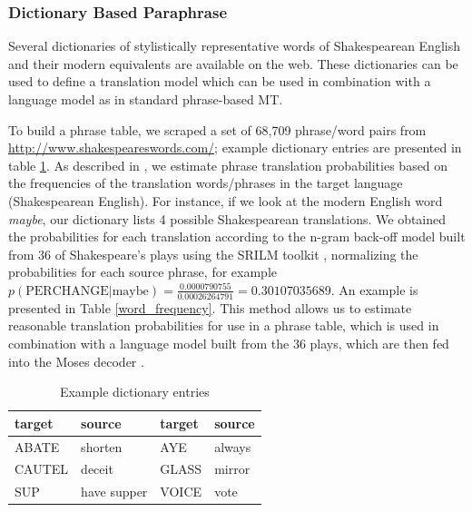 \documentclass[10pt,a5paper,twoside]{article}
\begin{document}
\subsubsection{Dictionary Based Paraphrase}
\label{dictionary_baseline}
Several dictionaries of stylistically representative words of Shakespearean English and their modern equivalents are available on the web.  
These dictionaries can be used to define a translation model which can be used in combination with a language model as in standard phrase-based MT.


To build a phrase table, we scraped a set of 68,709 phrase/word pairs from \url{http://www.shakespeareswords.com/}; 
example dictionary entries are presented in table \ref{dictionary_example}. 
As described in \cite{Koehn00}, we estimate phrase translation probabilities
based on the frequencies of the translation words/phrases in the target language (Shakespearean English).
For instance, if we look at the modern English word \emph{maybe}, our dictionary lists 4 possible Shakespearean translations. 
We obtained the probabilities for each translation according to the n-gram back-off model built from 36 of Shakespeare's 
plays using the SRILM toolkit \cite{Stolcke02}, 
normalizing the probabilities for each source phrase, for example $p(\text{PERCHANGE}|\text{maybe}) = \frac{0.0000790755}{0.00026264791} = 0.30107035689$.
An example is presented in Table \ref{word_frequency}.
This method allows us to estimate reasonable translation probabilities for use in a phrase table, which is used in combination 
with a language model built from the 36 plays, which are then fed into the Moses decoder \cite{Koehn07}.

\begin{table}
  \begin{center}
  \begin{tabular}{|l|l||l|l|}
    \hline
    target & source & target & source \\
    \hline
    \hline
    ABATE & shorten & AYE & always \\
    \hline
    CAUTEL & deceit & GLASS & mirror \\
    \hline
    SUP & have supper & VOICE & vote \\
    \hline
  \end{tabular}
  \end{center}
  \caption{Example dictionary entries}
  \label{dictionary_example}
\end{table}
\end{document}
